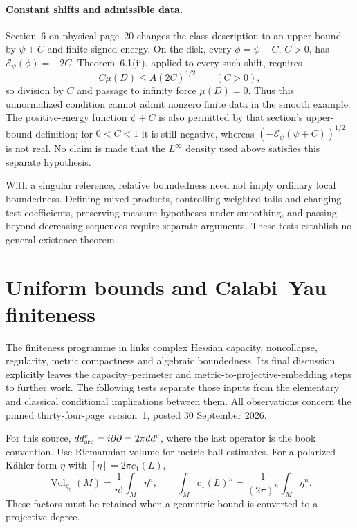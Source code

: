 \paragraph{Constant shifts and admissible data.}
Section~6 on physical page~20 changes the class description to an upper
bound by $\psi+C$ and finite signed energy. On the disk, every
$\phi=\psi-C$, $C>0$, has $\mathcal E_\psi(\phi)=-2C$.
Theorem~6.1(ii), applied to every such shift, requires
\[
 C\mu(D)\leq A(2C)^{1/2}\qquad(C>0),
\]
so division by $C$ and passage to infinity force $\mu(D)=0$.
Thus this unnormalized condition cannot admit nonzero finite data in
the smooth example. The positive-energy function $\psi+C$ is also
permitted by that section's upper-bound definition; for $0<C<1$ it is
still negative, whereas $(-\mathcal E_\psi(\psi+C))^{1/2}$
is not real. No claim is made that the $L^\infty$ density used above
satisfies this separate hypothesis.

With a singular reference, relative boundedness need not imply ordinary
local boundedness. Defining mixed products, controlling weighted tails
and changing test coefficients, preserving measure hypotheses under
smoothing, and passing beyond decreasing sequences require separate
arguments. These tests establish no general existence theorem.

\section{Uniform bounds and Calabi--Yau finiteness}
\label{sec:appL-polarized-CY-finiteness-boundary}

The finiteness programme in \cite{Truong26PolarizedCYFinitenessV1}
links complex Hessian capacity, noncollapse, regularity, metric
compactness and algebraic boundedness. Its final discussion explicitly
leaves the capacity--perimeter and metric-to-projective-embedding
steps to further work. The following tests separate those inputs from
the elementary and classical conditional implications between them.
All observations concern the pinned thirty-four-page version~1,
posted 30 September 2026.

For this source, \(dd^c_{\rm src}=i\partial\bar\partial
=2\pi dd^c\), where the last operator is the book convention.
Use Riemannian volume for metric ball estimates. For a polarized
K\"ahler form \(\eta\) with \([\eta]=2\pi c_1(L)\),
\[
 \operatorname{Vol}_{g_\eta}(M)=\frac1{n!}\int_M\eta^n,\qquad
 \int_Mc_1(L)^n=\frac1{(2\pi)^n}\int_M\eta^n.
\]
These factors must be retained when a geometric bound is converted
to a projective degree.

